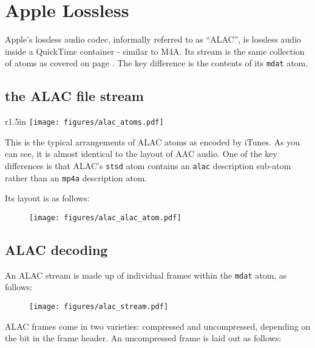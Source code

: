 
\chapter{Apple Lossless}

Apple's lossless audio codec, informally referred to as ``ALAC'',
is lossless audio inside a QuickTime container - similar to M4A.
Its stream is the same collection of atoms as covered on page
\pageref{m4a}.
The key difference is the contents of its \texttt{mdat} atom.

\section{the ALAC file stream}
\begin{wrapfigure}[6]{r}{1.5in}
\texttt{[image: figures/alac\_atoms.pdf]}
\end{wrapfigure}

This is the typical arrangements of ALAC atoms as encoded by iTunes.
As you can see, it is almost identical to the layout of AAC audio.
One of the key differences is that ALAC's \texttt{stsd} atom
contains an \texttt{alac} description sub-atom rather than an
\texttt{mp4a} description atom.

Its layout is as follows:

\begin{figure}[h]
\texttt{[image: figures/alac\_alac\_atom.pdf]}
\end{figure}

\pagebreak

\section{ALAC decoding}

An ALAC stream is made up of individual frames within the \texttt{mdat}
atom, as follows:

\begin{figure}[h]
\texttt{[image: figures/alac\_stream.pdf]}
\end{figure}
\par
\noindent
ALAC frames come in two varieties: compressed and uncompressed,
depending on the  bit in the frame header.
An uncompressed frame is laid out as follows:

